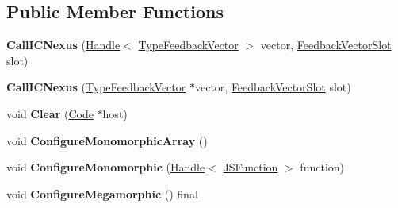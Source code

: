 \subsection*{Public Member Functions}
\begin{DoxyCompactItemize}
\item 
{\bfseries Call\+I\+C\+Nexus} (\hyperlink{classv8_1_1internal_1_1_handle}{Handle}$<$ \hyperlink{classv8_1_1internal_1_1_type_feedback_vector}{Type\+Feedback\+Vector} $>$ vector, \hyperlink{classv8_1_1internal_1_1_feedback_vector_slot}{Feedback\+Vector\+Slot} slot)\hypertarget{classv8_1_1internal_1_1_call_i_c_nexus_af7b1f581480515bae95596745ea0daac}{}\label{classv8_1_1internal_1_1_call_i_c_nexus_af7b1f581480515bae95596745ea0daac}

\item 
{\bfseries Call\+I\+C\+Nexus} (\hyperlink{classv8_1_1internal_1_1_type_feedback_vector}{Type\+Feedback\+Vector} $\ast$vector, \hyperlink{classv8_1_1internal_1_1_feedback_vector_slot}{Feedback\+Vector\+Slot} slot)\hypertarget{classv8_1_1internal_1_1_call_i_c_nexus_a449dfffb9df4a160cc9670e87a812ce7}{}\label{classv8_1_1internal_1_1_call_i_c_nexus_a449dfffb9df4a160cc9670e87a812ce7}

\item 
void {\bfseries Clear} (\hyperlink{classv8_1_1internal_1_1_code}{Code} $\ast$host)\hypertarget{classv8_1_1internal_1_1_call_i_c_nexus_ae1d4a17dc735a45ded535a9f820aa53b}{}\label{classv8_1_1internal_1_1_call_i_c_nexus_ae1d4a17dc735a45ded535a9f820aa53b}

\item 
void {\bfseries Configure\+Monomorphic\+Array} ()\hypertarget{classv8_1_1internal_1_1_call_i_c_nexus_a74a48288897c342f2b1caa13efbe0f4f}{}\label{classv8_1_1internal_1_1_call_i_c_nexus_a74a48288897c342f2b1caa13efbe0f4f}

\item 
void {\bfseries Configure\+Monomorphic} (\hyperlink{classv8_1_1internal_1_1_handle}{Handle}$<$ \hyperlink{classv8_1_1internal_1_1_j_s_function}{J\+S\+Function} $>$ function)\hypertarget{classv8_1_1internal_1_1_call_i_c_nexus_a976cf4b8d799e6bf751d0c0f25d8119f}{}\label{classv8_1_1internal_1_1_call_i_c_nexus_a976cf4b8d799e6bf751d0c0f25d8119f}

\item 
void {\bfseries Configure\+Megamorphic} () final\hypertarget{classv8_1_1internal_1_1_call_i_c_nexus_a3e386e2f2a055472243b013c960b05f9}{}\label{classv8_1_1internal_1_1_call_i_c_nexus_a3e386e2f2a055472243b013c960b05f9}


\end{DoxyCompactItemize}

